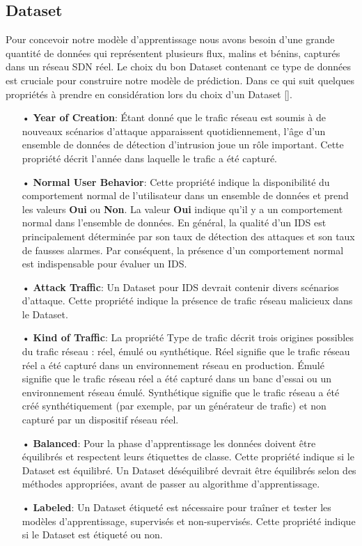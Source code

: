 \subsection{Dataset}
Pour concevoir notre modèle d'apprentissage nous avons besoin d'une grande quantité de données qui représentent plusieurs flux, malins et bénins, capturés dans un réseau SDN réel. Le choix du bon Dataset contenant ce type de données est cruciale pour construire notre modèle de prédiction. Dans ce qui suit quelques propriétés à prendre en considération lors du choix d'un Dataset [\cite{15}].\\
\begin{itemize}
\item[•]\textbf{Year of Creation}: Étant donné que le trafic réseau est soumis à de nouveaux scénarios d’attaque apparaissent quotidiennement, l’âge d’un ensemble de données de détection d’intrusion joue un rôle important. Cette propriété décrit l’année dans laquelle le trafic a été capturé.\\
\item[•]\textbf{Normal User Behavior}: Cette propriété indique la disponibilité du comportement normal de l’utilisateur dans un ensemble de données et prend les valeurs \textbf{Oui} ou \textbf{Non}. La valeur \textbf{Oui} indique qu’il y a un comportement normal dans l’ensemble de données. En général, la qualité d’un IDS est principalement déterminée par son taux de détection des attaques et son taux de fausses alarmes. Par conséquent, la présence d’un comportement normal est indispensable pour évaluer un IDS.\\
\item[•]\textbf{Attack Traffic}: Un Dataset pour IDS devrait contenir divers scénarios d’attaque. Cette propriété indique la présence de trafic réseau malicieux dans le Dataset.\\
\item[•]\textbf{Kind of Traffic}: La propriété Type de trafic décrit trois origines possibles du trafic réseau : réel, émulé ou synthétique. Réel signifie que le trafic réseau réel a été capturé dans un environnement réseau en production. Émulé signifie que le trafic réseau réel a été capturé dans un banc d’essai ou un environnement réseau émulé. Synthétique signifie que le trafic réseau a été créé synthétiquement (par exemple, par un générateur de trafic) et non capturé par un dispositif réseau réel.\\
\item[•]\textbf{Balanced}: Pour la phase d'apprentissage les données doivent être équilibrés et respectent  leurs étiquettes de classe. Cette propriété indique si le Dataset est équilibré. Un Dataset déséquilibré devrait être équilibrés selon des méthodes appropriées, avant de passer au algorithme d'apprentissage.\\
\item[•]\textbf{Labeled}: Un Dataset étiqueté est nécessaire pour traîner et tester les modèles d’apprentissage, supervisés et non-supervisés. Cette propriété indique si le Dataset est étiqueté ou non. 
\end{itemize}

